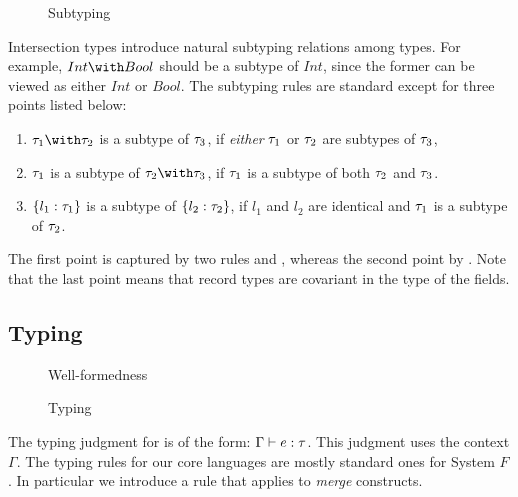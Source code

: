 \begin{figure}

\caption{Subtyping}
\end{figure}


Intersection types introduce natural subtyping relations among types. For
example, $ Int \intersects Bool $ should be a subtype of $ Int $, since the
former can be viewed as either $ Int $ or $ Bool $. The subtyping rules are
standard except for three points listed below:
\begin{enumerate}
\item $ \ty_1 \intersects \ty_2 $ is a subtype of $ \tau_3 $, if \emph{either} $ \tau_1 $ or
  $ \tau_2 $ are subtypes of $ \tau_3 $,

\item $ \tau_1 $ is a subtype of $ \ty_2 \intersects \ty_3 $, if $ \tau_1 $ is a subtype of
  both $ \tau_2 $ and $ \tau_3 $.

\item $ \{ l_1 : \tau_1 \} $ is a subtype of $ \{ l_2 : \tau_2 \} $, if
  $ l_1 $ and $ l_2 $ are identical and $ \tau_1 $ is a subtype of $ \tau_2 $.
\end{enumerate}
The first point is captured by two rules  and ,
whereas the second point by . Note that the last point means
that record types are covariant in the type of the fields.

\subsection{Typing}

\begin{figure}

\caption{Well-formedness}
\end{figure}

\begin{figure}



\caption{Typing}
\end{figure}

The typing judgment for \name is of the form: $ \Gamma \vdash e : \tau $. This
judgment uses the context $ \Gamma $. The typing rules for our core languages
are mostly standard ones for System $ F $. 
In particular we introduce a
 rule that applies to \emph{merge}
constructs.

